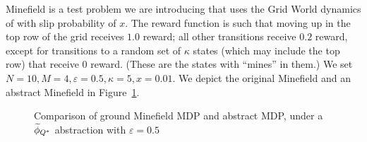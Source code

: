 Minefield is a test problem we are introducing that uses the Grid World dynamics of \citeauthor{russell1995modern} with slip probability of $x$. The reward function is such that moving up in the top row of the grid receives $1.0$ reward; all other transitions receive $0.2$ reward, except for transitions to a random set of $\kappa$ states (which may include the top row) that receive $0$ reward. (These are the states with ``mines'' in them.) We set $N=10, M=4, \varepsilon=0.5, \kappa = 5, x = 0.01$. We depict the original Minefield and an abstract Minefield in Figure~\ref{fig:minefield-visual}.

\begin{figure}
\centering
{}
\label{fig:minefield-visual}
\caption{Comparison of ground Minefield \ac{MDP} and abstract \ac{MDP}, under a $\widetilde \phi_{Q^*}$ abstraction with $\varepsilon=0.5$}
\end{figure} 

